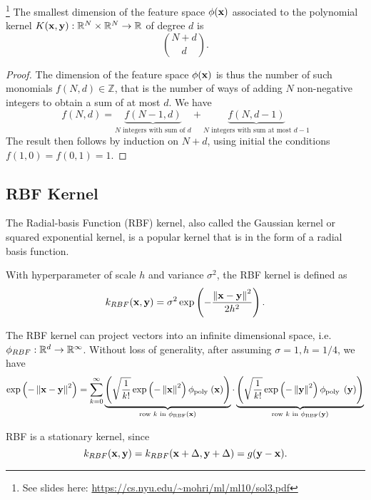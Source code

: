 \begin{property}\footnote{See slides here: \url{https://cs.nyu.edu/~mohri/ml/ml10/sol3.pdf}} The smallest dimension of the feature space $\phi(\mathbf{x})$ associated to the polynomial kernel $K(\mathbf{x}, \mathbf{y}): \mathbb{R}^N \times \mathbb{R}^N \rightarrow \mathbb{R}$ of degree $d$ is
$$
{N + d \choose d}.
$$	
\end{property}
\begin{proof}
The dimension of the feature space $\phi(\mathbf{x})$ is thus the number of such monomials $f(N, d) \in \mathbb{Z}$, that is the number of ways of adding $N$ non-negative integers
to obtain a sum of at most $d$. We have
\begin{equation}
	f(N, d) = \underbrace{f(N - 1, d)}_{N\text{ integers with sum of }d} + \underbrace{f(N, d - 1)}_{N\text{ integers with sum at most }d - 1}
\end{equation}
The result then follows by induction on $N + d$, using initial the conditions $f(1, 0) = f(0, 1) = 1$.
\end{proof}
\subsection{RBF Kernel}
The Radial-basis Function (RBF) kernel, also called the Gaussian kernel or squared exponential kernel,
is a popular kernel that is in the form of a radial basis function.
\begin{definition}
With hyperparameter of scale $h$ and variance $\sigma^2$, the RBF kernel is defined as
$$
	k_{RBF}(\mathbf{x}, \mathbf{y}) = \sigma^2 \exp\left(-\frac{\left\lVert \mathbf{x} - \mathbf{y} \right\rVert^2}{2 h^2} \right).
$$
\end{definition}
The RBF kernel can project vectors into an infinite dimensional space, i.e. $\phi_{RBF}: \mathbb{R}^d \rightarrow \mathbb{R}^\infty$. Without loss of generality, after assuming $\sigma = 1, h = 1/4$, we have
\begin{equation}
	\exp \left(-\left\lVert \mathbf{x}-\mathbf{y} \right\rVert^{2}\right)=\sum_{k=0}^{\infty} \underbrace{\left(\sqrt{\frac{1}{k !}} \exp \left(-\left\lVert \mathbf{x} \right\rVert^{2}\right) \phi_{\text {poly }}(\mathbf{x})\right)}_{\text {row } k \text { in } \phi_{\mathrm{RBF}}(\mathbf{x})} \cdot \underbrace{\left(\sqrt{\frac{1}{k !}} \exp \left(-\left\lVert \mathbf{y} \right\rVert^{2}\right) \phi_{\text {poly }}\left(\mathbf{y}\right)\right)}_{\text {row } k \text { in } \phi_{\mathrm{RBF}}\left(\mathbf{y}\right)}
\end{equation}
\begin{property}
	RBF is a stationary kernel, since 
	\begin{equation}
		k_{RBF}(\mathbf{x}, \mathbf{y}) = k_{RBF}(\mathbf{x} + \Delta, \mathbf{y} + \Delta) = g(\mathbf{y} - \mathbf{x}).
	\end{equation}
\end{property}

